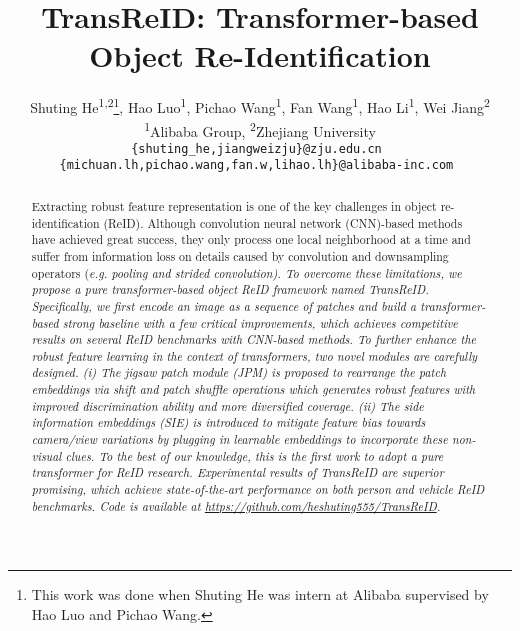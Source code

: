 \documentclass[10pt,twocolumn,letterpaper]{article}
\begin{document}
\title{TransReID: Transformer-based Object Re-Identification}

\newcommand*{\affaddr}[1]{#1}
\newcommand*{\affmark}[1][*]{\textsuperscript{#1}}
\author{Shuting He\affmark[1,2]\thanks{This work was done when Shuting He was intern at Alibaba supervised by Hao Luo and Pichao Wang.}, Hao Luo\affmark[1], Pichao Wang\affmark[1], Fan Wang\affmark[1],  Hao Li\affmark[1], Wei Jiang\affmark[2]\\
\affaddr{\affmark[1]Alibaba Group},
\affaddr{\affmark[2]Zhejiang University} \\
{  \tt\small\{shuting\_he,jiangweizju\}@zju.edu.cn }
{  \tt\small\{michuan.lh,pichao.wang,fan.w,lihao.lh\}@alibaba-inc.com }
}

\maketitle
\ificcvfinal\thispagestyle{empty}\fi

\begin{abstract}
Extracting robust feature representation is one of the key challenges in object re-identification (ReID). Although convolution neural network (CNN)-based methods have achieved great success, they only process one local neighborhood at a time and suffer from information loss on details caused by convolution and downsampling operators (\it{e.g.} pooling and strided convolution).
To overcome these limitations, we propose a pure transformer-based object ReID framework named TransReID. Specifically, we first encode an image as a sequence of patches and build a transformer-based strong baseline with a few critical improvements, which achieves competitive results on several ReID benchmarks with CNN-based methods.
To further enhance the robust feature learning in the context of transformers, two novel modules are carefully designed. (i) The jigsaw patch module (JPM) is proposed to rearrange the patch embeddings via shift and patch shuffle operations which generates robust features with improved discrimination ability and more diversified coverage. (ii) The side information embeddings (SIE) is introduced to mitigate feature bias towards camera/view variations by plugging in learnable embeddings to incorporate these non-visual clues.
To the best of our knowledge, this is the first work to adopt a pure transformer for ReID research. Experimental results of TransReID are superior promising, which achieve state-of-the-art performance on both person and vehicle ReID benchmarks. Code is available at \url{https://github.com/heshuting555/TransReID}.
\end{abstract}
\end{document}
